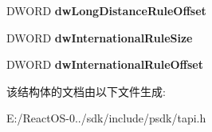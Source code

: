 \begin{DoxyCompactItemize}
\mbox{\label{structlinecountryentry__tag_a15831e158bbbb64204fda63cec208a10}} 
D\+W\+O\+RD {\bfseries dw\+Long\+Distance\+Rule\+Offset}
\item 
\mbox{\label{structlinecountryentry__tag_a7a048d8dfe5962eea82a73c7fe10477f}} 
D\+W\+O\+RD {\bfseries dw\+International\+Rule\+Size}
\item 
\mbox{\label{structlinecountryentry__tag_a1acc9f00c1121666a354ad37945ac25a}} 
D\+W\+O\+RD {\bfseries dw\+International\+Rule\+Offset}
\end{DoxyCompactItemize}


该结构体的文档由以下文件生成\+:\begin{DoxyCompactItemize}
\item 
E\+:/\+React\+O\+S-\/0../sdk/include/psdk/tapi.\+h\end{DoxyCompactItemize}
